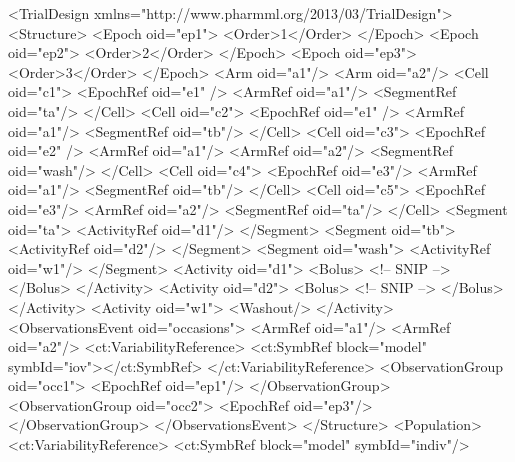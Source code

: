 \documentclass[a4paper,11pt]{article}
\begin{document}
\begin{xmlcode}
    <TrialDesign xmlns="http://www.pharmml.org/2013/03/TrialDesign">
        <Structure>
            <Epoch oid="ep1">
                <Order>1</Order>
            </Epoch>
            <Epoch oid="ep2">
                <Order>2</Order>
            </Epoch>
            <Epoch oid="ep3">
                <Order>3</Order>
            </Epoch>
            <Arm oid="a1"/>
            <Arm oid="a2"/>
            <Cell oid="c1">
                <EpochRef oid="e1" />
                <ArmRef oid="a1"/>
                <SegmentRef oid="ta"/>
            </Cell>
            <Cell oid="c2">
                <EpochRef oid="e1" />
                <ArmRef oid="a1"/>
                <SegmentRef oid="tb"/>
            </Cell>
            <Cell oid="c3">
                <EpochRef oid="e2" />
                <ArmRef oid="a1"/>
                <ArmRef oid="a2"/>
                <SegmentRef oid="wash"/>
            </Cell>
            <Cell oid="c4">
                <EpochRef oid="e3"/>
                <ArmRef oid="a1"/>
                <SegmentRef oid="tb"/>
            </Cell>
            <Cell oid="c5">
                <EpochRef oid="e3"/>
                <ArmRef oid="a2"/>
                <SegmentRef oid="ta"/>
            </Cell>
            <Segment oid="ta">
                <ActivityRef oid="d1"/>
            </Segment>
            <Segment oid="tb">
                <ActivityRef oid="d2"/>
            </Segment>
            <Segment oid="wash">
                <ActivityRef oid="w1"/>
            </Segment>
            <Activity oid="d1">
                <Bolus>
                <!-- SNIP -->
                </Bolus>
            </Activity>
            <Activity oid="d2">
                <Bolus>
                <!-- SNIP -->
                </Bolus>
            </Activity>
            <Activity oid="w1">
                <Washout/>
            </Activity>
            <ObservationsEvent oid="occasions">
                <ArmRef oid="a1"/>
                <ArmRef oid="a2"/>
                <ct:VariabilityReference>
                    <ct:SymbRef block="model" symbId="iov"></ct:SymbRef>
                </ct:VariabilityReference>
                <ObservationGroup oid="occ1">
                    <EpochRef oid="ep1"/>
                </ObservationGroup>
                <ObservationGroup oid="occ2">
                    <EpochRef oid="ep3"/>
                </ObservationGroup>
            </ObservationsEvent>
        </Structure>
        <Population>
            <ct:VariabilityReference>
                <ct:SymbRef block="model" symbId="indiv"/>

\end{xmlcode}
\end{document}
